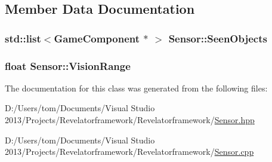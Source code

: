 \subsection{Member Data Documentation}
\hypertarget{class_sensor_a3ed58c2bc9140a884ce86014fbfd6926}{
\subsubsection[{Seen\-Objects}]{\setlength{\rightskip}{0pt plus 5cm}std\-::list$<${\bf Game\-Component} $\ast$ $>$ Sensor\-::\-Seen\-Objects\hspace{0.3cm}{\ttfamily [private]}}}\label{class_sensor_a3ed58c2bc9140a884ce86014fbfd6926}
\hypertarget{class_sensor_af509a7308626a219e017f07c0d25a78f}{
\subsubsection[{Vision\-Range}]{\setlength{\rightskip}{0pt plus 5cm}float Sensor\-::\-Vision\-Range\hspace{0.3cm}{\ttfamily [private]}}}\label{class_sensor_af509a7308626a219e017f07c0d25a78f}


The documentation for this class was generated from the following files\-:\begin{DoxyCompactItemize}
\item 
D\-:/\-Users/tom/\-Documents/\-Visual Studio 2013/\-Projects/\-Revelatorframework/\-Revelatorframework/\hyperlink{_sensor_8hpp}{Sensor.\-hpp}\item 
D\-:/\-Users/tom/\-Documents/\-Visual Studio 2013/\-Projects/\-Revelatorframework/\-Revelatorframework/\hyperlink{_sensor_8cpp}{Sensor.\-cpp}\end{DoxyCompactItemize}

